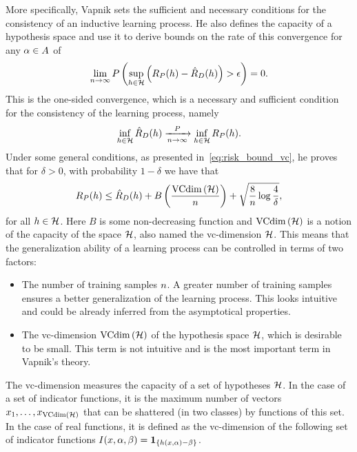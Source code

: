 More specifically, Vapnik sets the sufficient and necessary conditions for the consistency of an inductive learning process.
 He also defines the capacity of a hypothesis space and use it to derive bounds on the rate of this convergence for any $\alpha \in A$ of
 \begin{equation}
    \nonumber
    \lim_{n \to \infty} P\left(\sup_{h \in \mathcal{H}} \left(R_P(h) - \hat{R}_{D}(h) \right) > \epsilon \right) = 0.
\end{equation}
This is the one-sided convergence, which is a necessary and sufficient condition for the consistency of the learning process, namely
\begin{equation}
    \nonumber
    \inf_{h \in \mathcal{H}} \hat{R}_{D}(h) \xrightarrow[n \to \infty]{P} \inf_{h \in \mathcal{H}} R_P(h) .
\end{equation}
Under some general conditions, as presented in~\eqref{eq:risk_bound_vc}, he proves that for $\delta > 0$, with probability $1- \delta$ we have that
\begin{equation}
    \label{eq:ordinary_generalization_bound}
    \exprisk(\hypf) \leq \emprisk(\hypf) + B\left(\frac{\vcdim{\hypspace}}{\nsamples}\right)+ \sqrt{\frac{8}{\nsamples} \log \frac{4}{\delta}} ,
\end{equation}
for all $h \in \mathcal{H}$.
Here $B$ is some non-decreasing function and $\operatorname{VCdim}\left(\mathcal{H}\right)$ is a notion of the capacity of the space $\mathcal{H}$, also named the \acrshort{vc}-dimension $\mathcal{H}$. This means that the generalization ability of a learning process can be controlled in terms of two factors:
\begin{itemize}
    \item The number of training samples $n$. A greater number of training samples ensures a better generalization of the learning process. This looks intuitive and could be already inferred from the asymptotical properties. 
    \item The \acrshort{vc}-dimension $\operatorname{VCdim}\left(\mathcal{H}\right)$ of the hypothesis space $\mathcal{H}$, which is desirable to be small. This term is not intuitive and is the most important term in Vapnik's theory.
\end{itemize}
The \acrshort{vc}-dimension measures the capacity of a set of hypotheses $\mathcal{H}$. 
In the case of a set of indicator functions, it is the maximum number of vectors $x_1, \ldots, x_{\operatorname{VCdim}\left(\mathcal{H}\right)}$ that can be shattered (in two classes) by functions of this set. In the case of real functions, it is defined as the \acrshort{vc}-dimension of the following set of indicator functions $ I(x, \alpha, \beta) = \bm{1}_{\{h\left(x, \alpha\right) - \beta\}} $.
